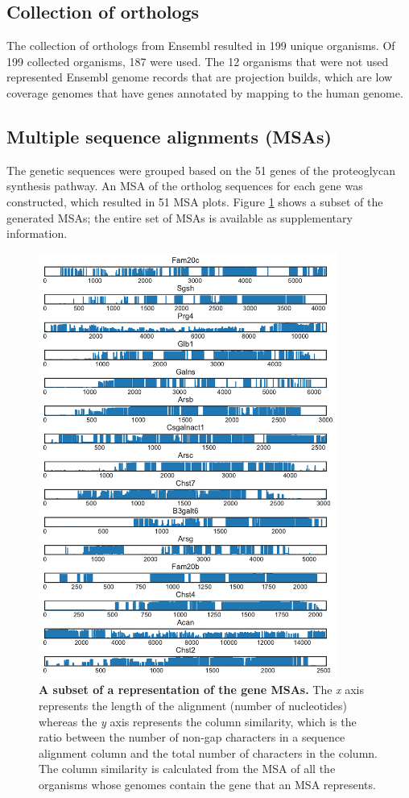 \documentclass{article}
\begin{document}
\subsection*{Collection of orthologs}

The collection of orthologs from Ensembl resulted in 199 unique organisms. Of 199 collected organisms, 187 were used. The 12 organisms that were not used represented Ensembl genome records that are projection builds, which are low coverage genomes that have genes annotated by mapping to the human genome. 

\subsection*{Multiple sequence alignments (MSAs)}

The genetic sequences were grouped based on the 51 genes of the proteoglycan synthesis pathway. An MSA of the ortholog sequences for each gene was constructed, which resulted in 51 MSA plots. Figure \ref{fig_1} shows a subset of the generated MSAs; the entire set of MSAs is available as supplementary information.

\begin{figure}
\centering
\includegraphics[height=5.5in]{./images/sample_msa.pdf}
\caption{\textbf{A subset of a representation of the gene MSAs.} The \textit{x} axis represents the length of the alignment (number of nucleotides) whereas the \textit{y} axis represents the column similarity, which is the ratio between the number of non-gap characters in a sequence alignment column and the total number of characters in the column. The column similarity is calculated from the MSA of all the organisms whose genomes contain the gene that an MSA represents.}
\label{fig_1}
\end{figure}
\end{document}
